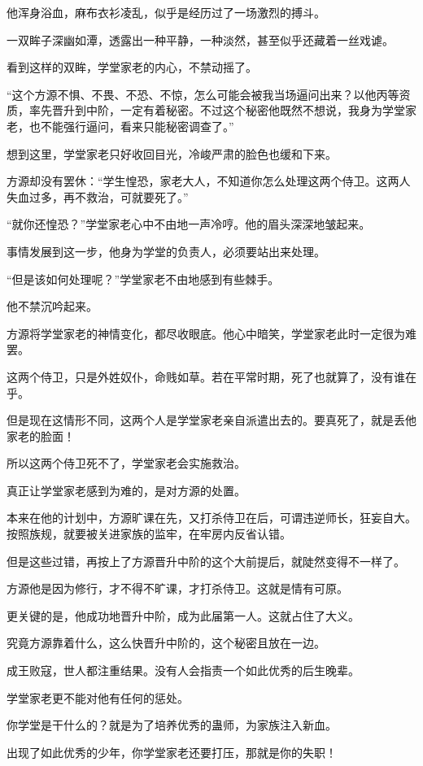 \begin{this_body}
他浑身浴血，麻布衣衫凌乱，似乎是经历过了一场激烈的搏斗。

一双眸子深幽如潭，透露出一种平静，一种淡然，甚至似乎还藏着一丝戏谑。

看到这样的双眸，学堂家老的内心，不禁动摇了。

“这个方源不惧、不畏、不恐、不惊，怎么可能会被我当场逼问出来？以他丙等资质，率先晋升到中阶，一定有着秘密。不过这个秘密他既然不想说，我身为学堂家老，也不能强行逼问，看来只能秘密调查了。”

想到这里，学堂家老只好收回目光，冷峻严肃的脸色也缓和下来。

方源却没有罢休：“学生惶恐，家老大人，不知道你怎么处理这两个侍卫。这两人失血过多，再不救治，可就要死了。”

“就你还惶恐？”学堂家老心中不由地一声冷哼。他的眉头深深地皱起来。

事情发展到这一步，他身为学堂的负责人，必须要站出来处理。

“但是该如何处理呢？”学堂家老不由地感到有些棘手。

他不禁沉吟起来。

方源将学堂家老的神情变化，都尽收眼底。他心中暗笑，学堂家老此时一定很为难罢。

这两个侍卫，只是外姓奴仆，命贱如草。若在平常时期，死了也就算了，没有谁在乎。

但是现在这情形不同，这两个人是学堂家老亲自派遣出去的。要真死了，就是丢他家老的脸面！

所以这两个侍卫死不了，学堂家老会实施救治。

真正让学堂家老感到为难的，是对方源的处置。

本来在他的计划中，方源旷课在先，又打杀侍卫在后，可谓违逆师长，狂妄自大。按照族规，就要被关进家族的监牢，在牢房内反省认错。

但是这些过错，再按上了方源晋升中阶的这个大前提后，就陡然变得不一样了。

方源他是因为修行，才不得不旷课，才打杀侍卫。这就是情有可原。

更关键的是，他成功地晋升中阶，成为此届第一人。这就占住了大义。

究竟方源靠着什么，这么快晋升中阶的，这个秘密且放在一边。

成王败寇，世人都注重结果。没有人会指责一个如此优秀的后生晚辈。

学堂家老更不能对他有任何的惩处。

你学堂是干什么的？就是为了培养优秀的蛊师，为家族注入新血。

出现了如此优秀的少年，你学堂家老还要打压，那就是你的失职！


\end{this_body}
